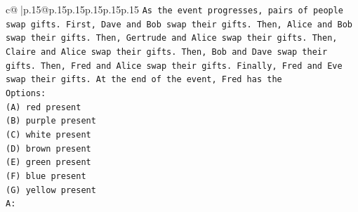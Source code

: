 \documentclass{article}
\begin{document}
{\begin{supertabular}{c@{$\;$}|p{.15\linewidth}@{}p{.15\linewidth}p{.15\linewidth}p{.15\linewidth}p{.15\linewidth}p{.15\linewidth}}
{{{\texttt{As the event progresses, pairs of people swap gifts. First, Dave and Bob swap their gifts. Then, Alice and Bob swap their gifts. Then, Gertrude and Alice swap their gifts. Then, Claire and Alice swap their gifts. Then, Bob and Dave swap their gifts. Then, Fred and Alice swap their gifts. Finally, Fred and Eve swap their gifts. At the end of the event, Fred has the} \\
\texttt{Options:} \\
\texttt{(A) red present} \\
\texttt{(B) purple present} \\
\texttt{(C) white present} \\
\texttt{(D) brown present} \\
\texttt{(E) green present} \\
\texttt{(F) blue present} \\
\texttt{(G) yellow present} \\
\texttt{A:} \\
            }
        }
    }
     \\ \\


\end{supertabular}}
\end{document}

